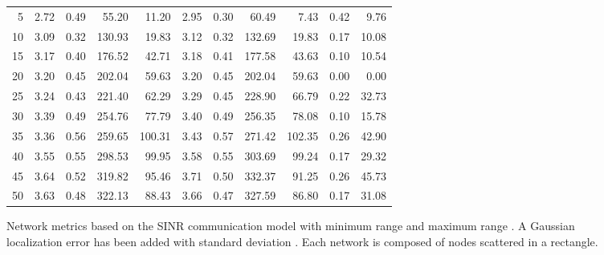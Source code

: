 \documentclass{article}
\begin{document}
\begin{figure}[h]
\begin{center}
\begin{tabular}{|r|rr|rr|rr|rr|rr|}
5  & 2.72 & 0.49 &  55.20 &  11.20 & 2.95 & 0.30 &  60.49 &   7.43 & 0.42 & 9.76\\
10 & 3.09 & 0.32 & 130.93 &  19.83 & 3.12 & 0.32 & 132.69 &  19.83 & 0.17 & 10.08\\
15 & 3.17 & 0.40 & 176.52 &  42.71 & 3.18 & 0.41 & 177.58 &  43.63 & 0.10 & 10.54\\
20 & 3.20 & 0.45 & 202.04 &  59.63 & 3.20 & 0.45 & 202.04 &  59.63 & 0.00 & 0.00\\
25 & 3.24 & 0.43 & 221.40 &  62.29 & 3.29 & 0.45 & 228.90 &  66.79 & 0.22 & 32.73\\
30 & 3.39 & 0.49 & 254.76 &  77.79 & 3.40 & 0.49 & 256.35 &  78.08 & 0.10 & 15.78\\
35 & 3.36 & 0.56 & 259.65 & 100.31 & 3.43 & 0.57 & 271.42 & 102.35 & 0.26 & 42.90\\
40 & 3.55 & 0.55 & 298.53 &  99.95 & 3.58 & 0.55 & 303.69 &  99.24 & 0.17 & 29.32\\
45 & 3.64 & 0.52 & 319.82 &  95.46 & 3.71 & 0.50 & 332.37 &  91.25 & 0.26 & 45.73\\
50 & 3.63 & 0.48 & 322.13 &  88.43 & 3.66 & 0.47 & 327.59 &  86.80 & 0.17 & 31.08\\
\hline
\end{tabular}
\caption{Network metrics based on the SINR communication model with minimum range  and maximum range . A Gaussian localization error has been added with standard deviation . Each network is composed of  nodes scattered in a  rectangle.}
\label{exp_sinrScal}
\end{center}
\end{figure}
 
\end{document}
